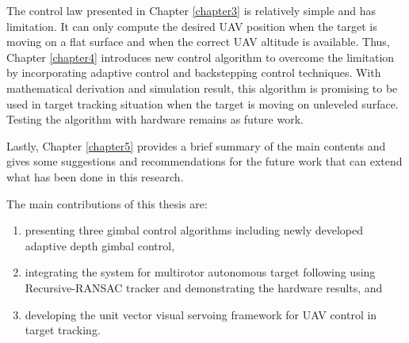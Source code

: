 The control law presented in Chapter \ref{chapter3} is relatively simple and has limitation. It can only compute the desired UAV position when the target is moving on a flat surface and when the correct UAV altitude is available. Thus, Chapter \ref{chapter4} introduces new control algorithm to overcome the limitation by incorporating adaptive control and backstepping control techniques. With mathematical derivation and simulation result, this algorithm is promising to be used in target tracking situation when the target is moving on unleveled surface. Testing the algorithm with hardware remains as future work. 

Lastly, Chapter \ref{chapter5} provides a brief summary of the main contents and gives some suggestions and recommendations for the future work that can extend what has been done in this research. 

The main contributions of this thesis are:
\begin{enumerate}
	\item presenting three gimbal control algorithms including newly developed adaptive depth gimbal control,
	\item integrating the system for multirotor autonomous target following using Recursive-RANSAC tracker and demonstrating the hardware results, and
	\item developing the unit vector visual servoing framework for UAV control in target tracking.
\end{enumerate}
